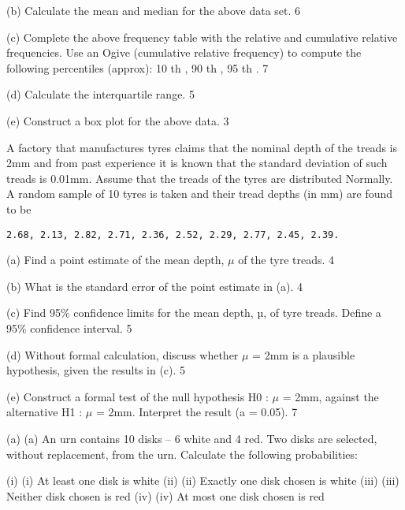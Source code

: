 (b) Calculate the mean and median for the above data set.			6 
 
(c) Complete the above frequency table with the relative and cumulative relative frequencies. Use an Ogive (cumulative relative frequency) to compute the following  percentiles  (approx): 10 th , 90 th , 95 th . 				7 
 
(d) Calculate the interquartile range. 						5
 
(e) Construct a box plot for the above data. 					3


A factory that manufactures tyres claims that the nominal depth of the treads is 2mm and from past experience it is known that the standard deviation of such treads is 0.01mm. Assume that the treads of the tyres are distributed Normally. A random sample of 10 tyres is taken and their tread depths (in mm) are found to be 

\begin{verbatim} 
2.68, 2.13, 2.82, 2.71, 2.36, 2.52, 2.29, 2.77, 2.45, 2.39.
\end{verbatim} 
(a) Find a point estimate of the mean depth, $\mu$ of the tyre treads. 		4 
 
(b) What is the standard error of the point estimate in (a). 			4
 
(c) Find 95\% confidence limits for the mean depth, µ, of tyre treads. Define a 95\%     confidence interval. 						5
 
(d) Without formal calculation, discuss whether $\mu$ = 2mm is a plausible  hypothesis,   given the results in (c). 						5
 
(e) Construct a formal test of the null hypothesis H0 : $\mu$ = 2mm, against the alternative  H1 : $\mu$ = 2mm. Interpret the result (a = 0.05).			7 										
 
 


(a)	(a)    An urn contains 10 disks – 6 white and 4 red.  Two disks are selected, without replacement, from the urn.  Calculate the following probabilities:
 
(i)	(i)                  At least one disk is white
(ii)	(ii)                Exactly one disk chosen is white
(iii)	(iii)               Neither disk chosen is red
(iv)	(iv)              At most one disk chosen is red

 
